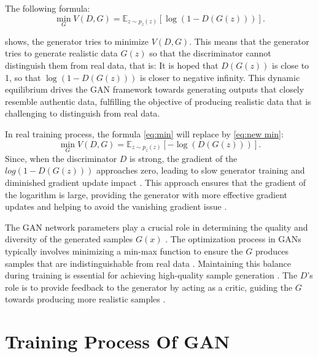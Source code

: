 The following formula:
\begin{equation}
    \label{eq:min}
    \min_{G} V(D, G) = \mathbb{E}_{z \sim p_{z}(z)} [\log(1 - D(G(z)))].
\end{equation}

shows, the generator tries to minimize $V(D, G)$. 
This means that the generator tries to generate realistic data $G(z)$ so that the discriminator cannot distinguish 
them from real data, that is: It is hoped that $D(G(z))$ is close to 1, so that $\log (1 - D(G(z)))$ is closer to negative infinity.
This dynamic equilibrium drives the GAN framework towards generating outputs that closely resemble authentic data, 
fulfilling the objective of producing realistic data that is challenging to distinguish from real data.




In real training process, the formula \eqref{eq:min} will replace by \eqref{eq:new min}:
\begin{equation}
    \label{eq:new min}
    \min_{G} V(D, G) = \mathbb{E}_{z \sim p_{z}(z)} [-\log(D(G(z)))].
\end{equation}
Since, when the discriminator $ D$ is strong, 
the gradient of the $log(1 - D(G(z)))$ approaches zero, leading to slow generator training and diminished gradient update impact \citep{10.1007/s11263-019-01265-2}.  
This approach ensures that the gradient of the logarithm is large, providing the generator with more effective gradient updates and 
helping to avoid the vanishing gradient issue \citep{10.1109/tpami.2018.2872043}.



The GAN network parameters play a crucial role in determining the quality and diversity of 
the generated samples $G(x)$ \citep{10.1007/s10928-021-09787-4}. The optimization process in GANs 
typically involves minimizing a min-max function to ensure the $G$ produces samples that 
are indistinguishable from real data \citep{10.1109/taslp.2017.2761547}. Maintaining this balance 
during training is essential for achieving high-quality sample generation \citep{10.1007/s10928-021-09787-4}. 
The $D$'s role is to provide feedback to the generator by acting as a critic, 
guiding the $G$ towards producing more realistic samples \citep{10.48550/arxiv.1802.05637}.



\section{Training Process Of GAN}

